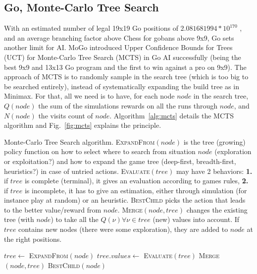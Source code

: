 \subsection{Go, Monte-Carlo Tree Search}
With an estimated number of legal 19x19 Go positions of $2.081681994 * 10^{170}$ \cite{tromp2006}, and an average branching factor above Chess for gobans above 9x9, Go sets another limit for AI. MoGo \citep{GellyUCT, Gelly2006} introduced Upper Confidence Bounds for Trees (UCT) for Monte-Carlo Tree Search (MCTS) in Go AI successfully (being the best 9x9 and 13x13 Go program and the first to win against a pro on 9x9). The approach of MCTS is to randomly sample in the search tree (which is too big to be searched entirely), instead of systematically expanding the build tree as in Minimax. For that, all we need is to have, for each node $node$ in the search tree, $Q(node)$ the sum of the simulations rewards on all the runs through $node$, and $N(node)$ the visits count of $node$. Algorithm~\ref{alg:mcts} details the MCTS algorithm and Fig.~\ref{fig:mcts} explains the principle.
\begin{algorithm}
\caption{Monte-Carlo Tree Search algorithm. 
\textsc{ExpandFrom}$(node)$ is the tree (growing) policy function on how to select where to search from situation $node$ (exploration or exploitation?) and how to expand the game tree (deep-first, breadth-first, heuristics?) in case of untried actions. \textsc{Evaluate}$(tree)$ may have 2 behaviors: \textbf{1.} if $tree$ is complete (terminal), it gives an evaluation according to games rules, \textbf{2.} if $tree$ is incomplete, it has to give an estimation, either through simulation (for instance play at random) or an heuristic. \textsc{BestChild} picks the action that leads to the better value/reward from $node$. \textsc{Merge}$(node, tree)$ changes the existing tree (with $node$) to take all the $Q(\nu) \forall \nu \in tree$ (new) values into account. If $tree$ contains new nodes (there were some exploration), they are added to $node$ at the right positions.}
\label{alg:mcts}
\begin{algorithmic}
        \State $tree \gets$ \textsc{ExpandFrom}$(node)$
        \State $tree.values \gets$ \textsc{Evaluate}$(tree)$
        \State \textsc{Merge}$(node, tree)$
    \EndWhile
    \State \Return \textsc{BestChild}$(node)$
\EndFunction
\end{algorithmic}
\end{algorithm}
